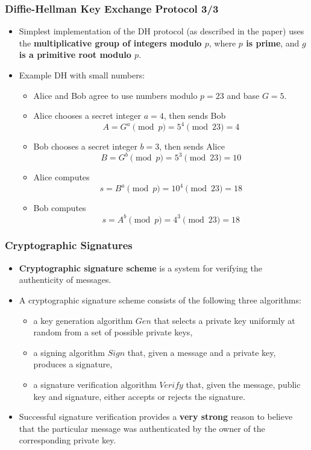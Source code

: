 \documentclass{beamer}
\begin{document}
\begin{frame}
  \frametitle{Diffie-Hellman Key Exchange Protocol 3/3}
  \begin{itemize}
  \item Simplest implementation of the DH protocol (as described in the paper)
    uses the \textbf{multiplicative group of integers modulo $p$}, where
    \textbf{$p$ is prime}, and\textbf{ $g$ is a primitive root modulo $p$}.
  \item Example DH with small numbers:
    \begin{itemize}
      \scriptsize
    \item Alice and Bob agree to use numbers modulo $p = 23$ and base $G = 5$.
    \item Alice chooses a secret integer $a = 4$, then sends Bob
        $$A = G^a \pmod{p} = 5^4 \pmod{23} = 4$$
    \item Bob chooses a secret integer $b = 3$, then sends Alice
      $$B = G^b \pmod{p} = 5^3 \pmod{23} = 10$$
    \item Alice computes
      $$s = B^a \pmod{p} = 10^4 \pmod{23} = 18$$
    \item Bob computes
      $$s = A^b \pmod{p} = 4^3 \pmod{23} = 18$$
    \end{itemize}
  \end{itemize}
\end{frame}

\begin{frame}
  \frametitle{Cryptographic Signatures}
  \begin{itemize}
  \item \textbf{Cryptographic signature scheme} is a system for verifying the
    authenticity of messages.
  \item A cryptographic signature scheme consists of the following three
    algorithms:
    \begin{itemize}
    \item a key generation algorithm $Gen$ that selects a private key uniformly
      at random from a set of possible private keys,
    \item a signing algorithm $Sign$ that, given a message and a private key,
      produces a signature,
    \item a signature verification algorithm $Verify$ that, given the message,
      public key and signature, either accepts or rejects the signature.
    \end{itemize}
  \item Successful signature verification provides a \textbf{very strong} reason
    to believe that the particular message was authenticated by the owner of the
    corresponding private key.
  \end{itemize}
\end{frame}
\end{document}
